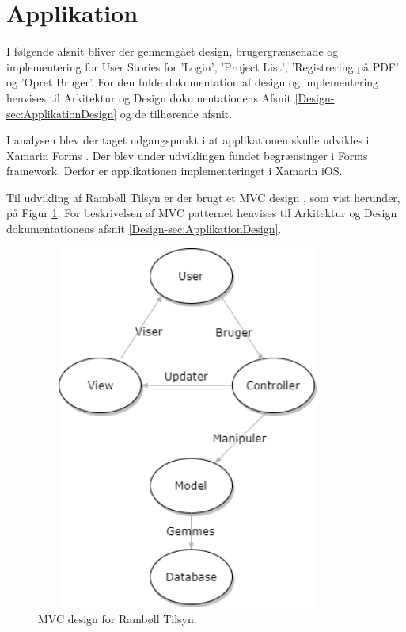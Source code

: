 \section{Applikation}
I følgende afsnit bliver der gennemgået design, brugergrænseflade og implementering for User Stories for 'Login', 'Project List', 'Registrering på PDF' og 'Opret Bruger'. For den fulde dokumentation af design og implementering henvises til Arkitektur og Design dokumentationens Afsnit \ref{Design-sec:ApplikationDesign} og de tilhørende afsnit.

I analysen blev der taget udgangspunkt i at applikationen skulle udvikles i Xamarin Forms \cite{Forms}. Der blev under udviklingen fundet begrænsinger i Forms framework. Derfor er applikationen implementeringet i Xamarin iOS.

Til udvikling af Rambøll Tilsyn er der brugt et MVC design \cite{MVC}, som vist herunder, på Figur \ref{fig:MVC}. For beskrivelsen af MVC patternet henvises til Arkitektur og Design dokumentationens afsnit \ref{Design-sec:ApplikationDesign}.
\begin{figure}[H] %
	\centering
	\includegraphics[height=12cm, width=10cm]{Design/Applikation/MVC}
	\caption{MVC design for Rambøll Tilsyn.}
	\label{fig:MVC}
\end{figure}

\clearpage






